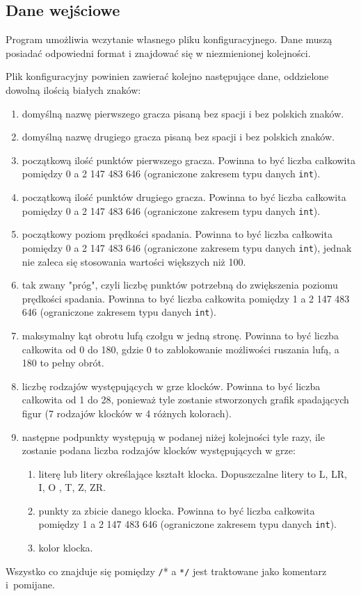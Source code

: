 \documentclass[12pt]{report}
\newcommand{\code}[1]{\texttt{#1}}
\begin{document}
\subsection{Dane wejściowe}
Program umożliwia wczytanie własnego pliku konfiguracyjnego. Dane muszą posiadać odpowiedni format i znajdować się w niezmienionej kolejności.\par
    Plik konfiguracyjny powinien zawierać kolejno następujące dane, oddzielone dowolną ilością białych znaków:
    \begin{enumerate}
        \item domyślną nazwę pierwszego gracza pisaną bez spacji i bez polskich znaków.
        \item domyślną nazwę drugiego gracza pisaną bez spacji i bez polskich znaków.
        \item początkową ilość punktów pierwszego gracza. Powinna to być liczba całkowita pomiędzy 0 a 2 147 483 646 (ograniczone zakresem typu danych \code{int}).
        \item początkową ilość punktów drugiego gracza. Powinna to być liczba całkowita pomiędzy 0 a 2 147 483 646 (ograniczone zakresem typu danych \code{int}).
        \item początkowy poziom prędkości spadania. Powinna to być liczba całkowita pomiędzy 0 a 2 147 483 646 (ograniczone zakresem typu danych \code{int}), jednak nie zaleca się stosowania wartości większych niż 100.
        \item tak zwany "próg", czyli liczbę punktów potrzebną do zwiększenia poziomu prędkości spadania. Powinna to być liczba całkowita pomiędzy 1 a 2 147 483 646 (ograniczone zakresem typu danych \code{int}).
        \item maksymalny kąt obrotu lufą czołgu w jedną stronę. Powinna to być liczba całkowita od 0 do 180, gdzie 0 to zablokowanie możliwości ruszania lufą, a 180 to pełny obrót.
        \item liczbę rodzajów występujących w grze klocków. Powinna to być liczba całkowita od 1 do 28, ponieważ tyle zostanie stworzonych grafik spadających figur (7 rodzajów klocków w 4 różnych kolorach).
        \item następne podpunkty występują w podanej niżej kolejności tyle razy, ile zostanie podana liczba rodzajów klocków występujących w grze:
        \begin{enumerate}
            \item literę lub litery określające kształt klocka. Dopuszczalne litery to L, LR, I, O , T, Z, ZR.
            \item punkty za zbicie danego klocka. Powinna to być liczba całkowita pomiędzy 1 a 2 147 483 646 (ograniczone zakresem typu danych \code{int}).
            \item kolor klocka.
        \end{enumerate}
    \end{enumerate}
    Wszystko co znajduje się pomiędzy \code{/}* a \code{*/} jest traktowane jako komentarz i~pomijane.
\end{document}
